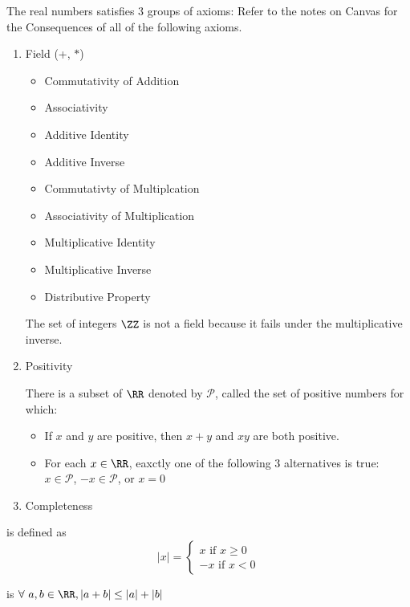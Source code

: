 \documentclass[12pt]{scrartcl}
\begin{document}
\begin{definition}
  The real numbers \vocab{$\RR$} satisfies 3 groups of axioms: Refer to the notes on Canvas for the Consequences of all of the following axioms.
  \begin{enumerate}
    \item Field (+, $*$) 
    \begin{itemize}
      \item Commutativity of Addition
      \item Associativity
      \item Additive Identity
      \item Additive Inverse
      \item Commutativty of Multiplcation
      \item Associativity of Multiplication
      \item Multiplicative Identity
      \item Multiplicative Inverse
      \item Distributive Property
    \end{itemize}
  The set of integers $\ZZ$ is not a field because it fails under the multiplicative inverse.
    \item Positivity
    
    There is a subset of $\RR$ denoted by $\mathcal{P}$, called the set of positive numbers for which: 
    \begin{itemize}
      \item If $x$ and $y$ are positive, then $x + y$ and $xy$ are both positive.
      \item For each $x \in \RR$, eaxctly one of the following 3 alternatives is true: $x \in \mathcal{P}$, $-x \in \mathcal{P}$, or $x = 0$
    \end{itemize}

    \item Completeness
  \end{enumerate}
\end{definition}

\begin{definition}
   is defined as 
  \[|x| = \begin{cases}
    x \text{ if } x \geq 0\\
    -x \text{ if } x < 0 
  \end{cases}\]

\end{definition}

\begin{definition}
   is $\forall \ a, b \in \RR, |a + b| \leq |a| + |b|$
\end{definition}
\end{document}
